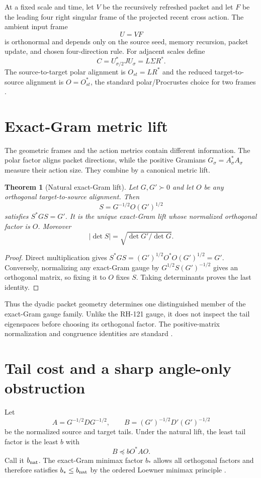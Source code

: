 \documentclass[12pt]{article}
\newtheorem{theorem}{Theorem}
\begin{document}
At a fixed scale and time, let $V$ be the recursively refreshed packet and
let $F$ be the leading four right singular frame of the projected recent
cross action.  The ambient input frame
\[
 U=VF
\]
is orthonormal and depends only on the source seed, memory recursion, packet
update, and chosen four-direction rule.  For adjacent scales define
\[
 C=U_{\sigma/2}^*J U_\sigma=L\Sigma R^*.
\]
The source-to-target polar alignment is $O_{st}=LR^*$ and the reduced
target-to-source alignment is $O=O_{st}^*$, the standard polar/Procrustes
choice for two frames \citep{GolubVanLoan2013}.

\section{Exact-Gram metric lift}
The geometric frames and the action metrics contain different information.
The polar factor aligns packet directions, while the positive Gramians
$G_\sigma=A_\sigma^*A_\sigma$ measure their action size.  They combine by a
canonical metric lift.

\begin{theorem}[Natural exact-Gram lift]\label{thm:lift}
Let $G,G'\succ0$ and let $O$ be any orthogonal target-to-source alignment.
Then
\[
 S=G^{-1/2}O(G')^{1/2}
\]
satisfies $S^*GS=G'$.  It is the unique exact-Gram lift whose normalized
orthogonal factor is $O$.  Moreover
\[
 |\det S|=\sqrt{\det G'/\det G}.
\]
\end{theorem}
\begin{proof}
Direct multiplication gives
$S^*GS=(G')^{1/2}O^*O(G')^{1/2}=G'$.  Conversely, normalizing any exact-Gram
gauge by $G^{1/2}S(G')^{-1/2}$ gives an orthogonal matrix, so fixing it to
$O$ fixes $S$.  Taking determinants proves the last identity.
\end{proof}

Thus the dyadic packet geometry determines one distinguished member of the
exact-Gram gauge family.  Unlike the RH-121 gauge, it does not inspect the
tail eigenspaces before choosing its orthogonal factor.  The positive-matrix
normalization and congruence identities are standard \citep{Bhatia1997}.

\section{Tail cost and a sharp angle-only obstruction}
Let
\[
 A=G^{-1/2}DG^{-1/2},\qquad
 B=(G')^{-1/2}D'(G')^{-1/2}
\]
be the normalized source and target tails.  Under the natural lift, the least
tail factor is the least $b$ with
\[
 B\preceq bO^*AO.
\]
Call it $b_{\rm nat}$.  The exact-Gram minimax factor $b_*$ allows all
orthogonal factors and therefore satisfies $b_*\leq b_{\rm nat}$ by the
ordered Loewner minimax principle \citep{HornJohnson1991}.
\end{document}
